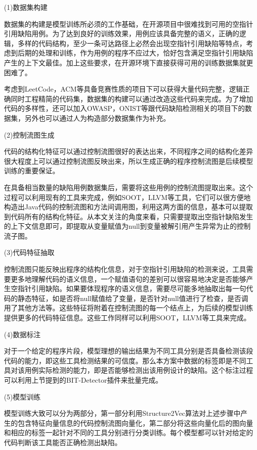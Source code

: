 (1)数据集构建

数据集的构建是模型训练所必须的工作基础，在开源项目中很难找到可用的空指针引用缺陷用例。为了达到良好的训练效果，用例应该具备完整的语义，正确的逻辑，多样的代码结构，至少一条可达路径上必然会出现空指针引用缺陷等特点，考虑到后期的处理和训练，作为用例的程序不应过大，恰好包含满足空指针引用缺陷产生的上下文最佳。加上这些要求，在开源环境下直接获得可用的训练数据集就更困难了。

考虑到LeetCode，ACM等具备竞赛性质的项目下可以获得大量代码完整，逻辑正确同时工程精简的代码集，数据集的构建可以通过改造这些代码来完成。为了增加代码的多样性，还可以加入OWASP，ONIST等跟代码缺陷检测相关的项目下的数据集，另外也可以通过人为构造部分数据集作为补充。

(2)控制流图生成

代码的结构化特征可以通过控制流图很好的表达出来，不同程序之间的结构化差异很大程度上可以通过控制流图反映出来，所以生成正确的程序控制流图是后续模型训练的重要保证。

在具备相当数量的缺陷用例数据集后，需要将这些用例的控制流图提取出来。这个过程可以利用现有的工具来完成，例如SOOT，LLVM等工具，它们可以很方便地构造出Java代码的控制流图和方法间调用图，利用这两方面的信息，基本可以提取到代码所有的结构化特征。从本文关注的角度来看，只需要提取出空指针缺陷发生的上下文信息即可，即提取从变量赋值为null到变量被解引用产生异常为止的控制流子图。

(3)代码特征抽取

控制流图只能反映出程序的结构化信息，对于空指针引用缺陷的检测来说，工具需要更多地理解代码的语义信息，一个赋值语句的差别可以很容易地决定是否能够产生空指针引用缺陷。如果要体现程序的语义信息，需要尽可能多地抽取出每一句代码的静态特征，如是否将null赋值给了变量，是否针对null值进行了检查，是否调用了其他方法等。这些特征将附着在控制流图的每一个结点上，为后续的模型训练提供更多的代码特征信息。这些工作同样可以利用SOOT，LLVM等工具来完成。

(4)数据标注

对于一个给定的程序片段，模型理想的输出结果为不同工具分别是否具备检测该段代码的能力，即这些工具检测结果的可信度。那么本方案中数据的标签即是不同工具对该用例实际检测的能力，即是否能够检测出该用例设计的缺陷。这个标注过程可以利用上节提到的BIT-Detector插件来批量完成。

(5)模型训练

模型训练大致可以分为两部分，第一部分利用Structure2Vec算法对上述步骤中产生的包含特征向量信息的代码控制流图向量化，第二部分将这些向量化后的图向量和相应的标签一起针对不同的工具分别进行分类训练。每个模型都可以针对给定的代码判断该工具能否正确检测出缺陷。

